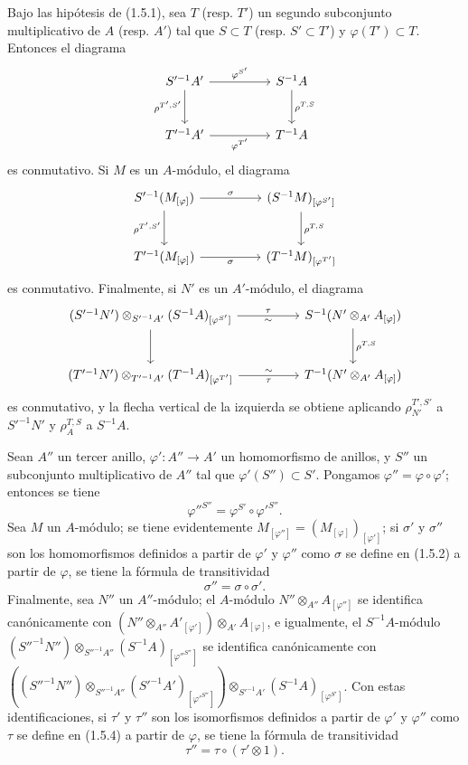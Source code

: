 \begin{env}[1.5.6]
\label{0.1.5.6-fr}
Bajo las hipótesis de (1.5.1), sea $T$ (resp. $T'$) un segundo subconjunto
multiplicativo de $A$ (resp. $A'$) tal que $S\subset T$ (resp. $S'\subset T'$)
y $\varphi(T')\subset T$. Entonces el diagrama
\[
\begin{tikzcd}[column sep=huge,row sep=large]
S'^{-1}A' \arrow[r,"\varphi^{S'}"] \arrow[d,"\rho^{T',S'}"']
  & S^{-1}A \arrow[d,"\rho^{T,S}"] \\
T'^{-1}A' \arrow[r,"\varphi^{T'}"']
  & T^{-1}A
\end{tikzcd}
\]
es conmutativo. Si $M$ es un $A$-módulo, el diagrama
\[
\begin{tikzcd}[column sep=huge,row sep=large]
S'^{-1}(M_{[\varphi]}) \arrow[r,"\sigma"] \arrow[d,"\rho^{T',S'}"']
  & (S^{-1}M)_{[\varphi^{S'}]} \arrow[d,"\rho^{T,S}"] \\
T'^{-1}(M_{[\varphi]}) \arrow[r,"\sigma"']
  & (T^{-1}M)_{[\varphi^{T'}]}
\end{tikzcd}
\]
es conmutativo. Finalmente, si $N'$ es un $A'$-módulo, el diagrama
\[
\begin{tikzcd}[column sep=huge,row sep=large]
(S'^{-1}N')\otimes_{S'^{-1}A'}(S^{-1}A)_{[\varphi^{S'}]}
  \arrow[r,"\tau","{\sim}"'] \arrow[d]
  & S^{-1}(N'\otimes_{A'}A_{[\varphi]}) \arrow[d,"\rho^{T,S}"] \\
(T'^{-1}N')\otimes_{T'^{-1}A'}(T^{-1}A)_{[\varphi^{T'}]}
  \arrow[r,"\tau"',"{\sim}"]
  & T^{-1}(N'\otimes_{A'}A_{[\varphi]})
\end{tikzcd}
\]
es conmutativo, y la flecha vertical de la izquierda se obtiene aplicando
$\rho_{N'}^{T',S'}$ a $S'^{-1}N'$ y $\rho_A^{T,S}$ a $S^{-1}A$.
\end{env}


\begin{env}[1.5.7]
\label{0.1.5.7-fr}
Sean $A''$ un tercer anillo, $\varphi':A''\to A'$ un homomorfismo
de anillos, y $S''$ un subconjunto multiplicativo de $A''$ tal que
$\varphi'(S'')\subset S'$. Pongamos $\varphi''=\varphi\circ\varphi'$; entonces se tiene
\[
  \varphi''^{S''}=\varphi^{S'}\circ\varphi'^{S''}.
\]
Sea $M$ un $A$-módulo; se tiene evidentemente
$M_{[\varphi'']}=(M_{[\varphi]})_{[\varphi']}$; si $\sigma'$ y $\sigma''$ son
los homomorfismos definidos a partir de $\varphi'$ y $\varphi''$ como $\sigma$
se define en (1.5.2) a partir de $\varphi$, se tiene la fórmula de transitividad
\[
  \sigma''=\sigma\circ\sigma'.
\]
Finalmente, sea $N''$ un $A''$-módulo; el $A$-módulo
$N''\otimes_{A''}A_{[\varphi'']}$ se identifica canónicamente con
$(N''\otimes_{A''}A'_{[\varphi']})\otimes_{A'}A_{[\varphi]}$,
e igualmente, el $S^{-1}A$-módulo
$(S''^{-1}N'')\otimes_{S''^{-1}A''}(S^{-1}A)_{[\varphi''^{S''}]}$
se identifica canónicamente con
$((S''^{-1}N'')\otimes_{S''^{-1}A''}(S'^{-1}A')_{[\varphi'^{S''}]})\otimes_{S'^{-1}A'}(S^{-1}A)_{[\varphi^{S'}]}$.
Con estas identificaciones, si $\tau'$ y $\tau''$ son los isomorfismos definidos
a partir de $\varphi'$ y $\varphi''$ como $\tau$ se define en (1.5.4) a
partir de $\varphi$, se tiene la fórmula de transitividad
\[
  \tau''=\tau\circ(\tau'\otimes 1).
\]
\end{env}

